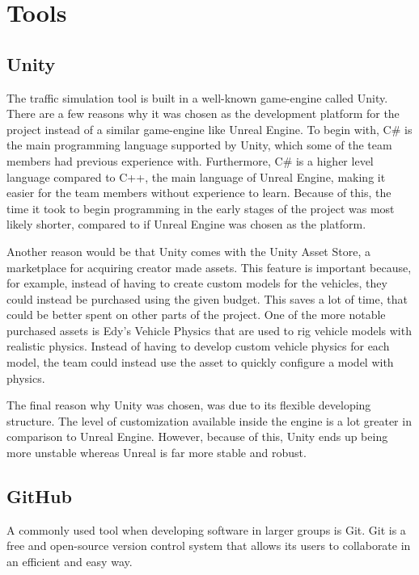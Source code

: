 
\section{Tools}


\subsection{Unity}
    The traffic simulation tool is built in a well-known game-engine called Unity. There are a few reasons why it was chosen as the development platform for the project instead of a similar game-engine like Unreal Engine. To begin with, C\# is the main programming language supported by Unity, which some of the team members had previous experience with. Furthermore, C\# is a higher level language compared to C++, the main language of Unreal Engine, making it easier for the team members without experience to learn. Because of this, the time it took to begin programming in the early stages of the project was most likely shorter, compared to if Unreal Engine was chosen as the platform.

    Another reason would be that Unity comes with the Unity Asset Store, a marketplace for acquiring creator made assets. This feature is important because, for example, instead of having to create custom models for the vehicles, they could instead be purchased using the given budget. This saves a lot of time, that could be better spent on other parts of the project. One of the more notable purchased assets is Edy's Vehicle Physics\cite{edy} that are used to rig vehicle models with realistic physics. Instead of having to develop custom vehicle physics for each model, the team could instead use the asset to quickly configure a model with physics.

    The final reason why Unity was chosen, was due to its flexible developing structure. The level of customization available inside the engine is a lot greater in comparison to Unreal Engine. However, because of this, Unity ends up being more unstable whereas Unreal is far more stable and robust.

\subsection{GitHub}
    A commonly used tool when developing software in larger groups is Git\cite{git}. Git is a free and open-source version control system that allows its users to collaborate in an efficient and easy way. 

